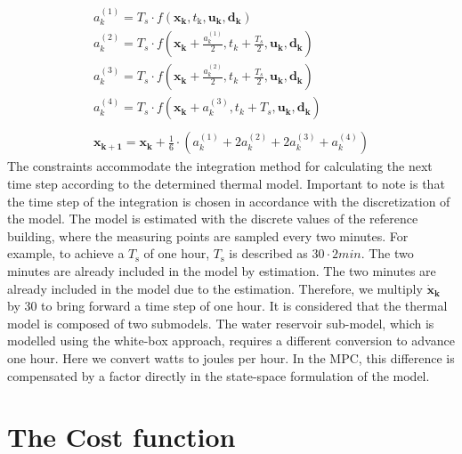     \begin{align}
        \label{Runke-Kutta}
        a_k^{(1)} = T_s \cdot f(\mathbf{x_k},t_\text{k},\mathbf{u_k},\mathbf{d_k}) \\
        a_k^{(2)} = T_s \cdot f(\mathbf{x_k}+\frac{a_k^{(1)}}{2},t_k+\frac{T_s}{2},\mathbf{u_k},\mathbf{d_k})\nonumber\\
        a_k^{(3)} = T_s \cdot f(\mathbf{x_k}+\frac{a_k^{(2)}}{2},t_k+\frac{T_s}{2},\mathbf{u_k},\mathbf{d_k})\nonumber\\
        a_k^{(4)} = T_s \cdot f(\mathbf{x_k}+a_k^{(3)},t_k+T_s,\mathbf{u_k},\mathbf{d_k})\nonumber\\
        \nonumber\\
        \mathbf{x_{k+1}} = \mathbf{x_k} + \frac{1}{6}\cdot (a_k^{(1)} + 2 a_k^{(2)} + 2 a_k^{(3)} + a_k^{(4)})\nonumber
    \end{align}
The constraints accommodate the integration method for calculating the next time step according to the determined thermal model.
Important to note is that the time step of the integration is chosen in accordance with the discretization of the model. The model is estimated with the discrete values of the reference building, where the measuring points are sampled every two minutes. For example, to achieve a $T_\text{s}$ of one hour, $T_\text{s}$ is described as $30 \cdot 2 min$. The two minutes are already included in the model by estimation. The two minutes are already included in the model due to the estimation. Therefore, we multiply $\mathbf{\dot{x}_\text{k}}$ by 30 to bring forward a time step of one hour. It is considered that the thermal model is composed of two submodels. The water reservoir sub-model, which is modelled using the white-box approach, requires a different conversion to advance one hour. Here we convert watts to joules per hour. In the MPC, this difference is compensated by a factor directly in the state-space formulation of the model.

\section{The Cost function}
\label{section:thecostfunction}

